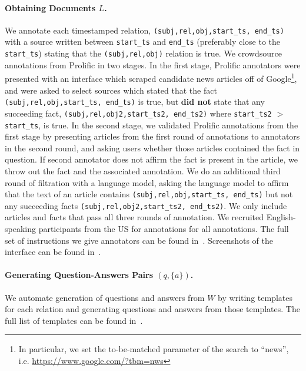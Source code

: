 \paragraph{Obtaining Documents $L$.} We annotate each timestamped relation, \verb|(subj,rel,obj,start_ts, end_ts)| with a source written between \verb|start_ts| and \verb|end_ts| (preferably close to the \verb|start_ts|) stating that the \verb|(subj,rel,obj)| relation is true. We crowdsource annotations from Prolific in two stages. In the first stage, Prolific annotators were presented with an interface which scraped candidate news articles off of Google\footnote{In particular, we set the to-be-matched parameter of the search to ``news'', i.e. \url{https://www.google.com/?tbm=nws}}, and were asked to select sources which stated that the fact \verb|(subj,rel,obj,start_ts, end_ts)| is true, but \textbf{did not} state that any succeeding fact, \verb|(subj,rel,obj2,start_ts2, end_ts2)| where \verb|start_ts2| $>$ \verb|start_ts|, is true.
In the second stage, we validated Prolific annotations from the first stage by presenting articles from the first round of annotations to annotators in the second round, and asking users whether those articles contained the fact in question. If second annotator does not affirm the fact is present in the article, we throw out the fact and the associated annotation.
We do an additional third round of filtration with a language model, asking the language model to affirm that the text of an article contains \verb|(subj,rel,obj,start_ts, end_ts)| but not any succeeding facts \verb|(subj,rel,obj2,start_ts2, end_ts2)|.
We only include articles and facts that pass all three rounds of annotation.
We recruited English-speaking participants from the US for annotations for all annotations. The full set of instructions we give annotators can be found in~.
Screenshots of the interface can be found in~.

\paragraph{Generating Question-Answers Pairs $(q,\{a\})$.} We automate generation of questions and answers from $W$ by writing templates for each relation and generating questions and answers from those templates. The full list of templates can be found in~.

